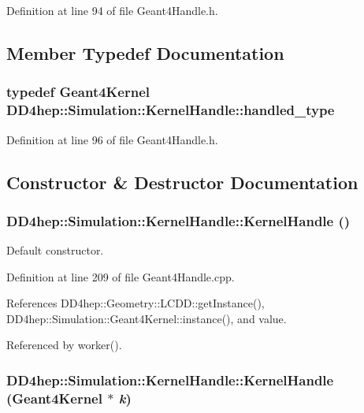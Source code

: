 Definition at line 94 of file Geant4Handle.h.

\subsection{Member Typedef Documentation}
\hypertarget{class_d_d4hep_1_1_simulation_1_1_kernel_handle_ab3846addea4978dab36bdb0cfb53dc34}{
\subsubsection[{handled\_\-type}]{\setlength{\rightskip}{0pt plus 5cm}typedef {\bf Geant4Kernel} {\bf DD4hep::Simulation::KernelHandle::handled\_\-type}}}
\label{class_d_d4hep_1_1_simulation_1_1_kernel_handle_ab3846addea4978dab36bdb0cfb53dc34}


Definition at line 96 of file Geant4Handle.h.

\subsection{Constructor \& Destructor Documentation}
\hypertarget{class_d_d4hep_1_1_simulation_1_1_kernel_handle_a03e3f33ee46b60ab2daaad008ef59418}{
\subsubsection[{KernelHandle}]{\setlength{\rightskip}{0pt plus 5cm}DD4hep::Simulation::KernelHandle::KernelHandle ()}}
\label{class_d_d4hep_1_1_simulation_1_1_kernel_handle_a03e3f33ee46b60ab2daaad008ef59418}


Default constructor. 

Definition at line 209 of file Geant4Handle.cpp.

References DD4hep::Geometry::LCDD::getInstance(), DD4hep::Simulation::Geant4Kernel::instance(), and value.

Referenced by worker().\hypertarget{class_d_d4hep_1_1_simulation_1_1_kernel_handle_afdab1fdc93f7b1a96c792dd03f97a6ef}{
\subsubsection[{KernelHandle}]{\setlength{\rightskip}{0pt plus 5cm}DD4hep::Simulation::KernelHandle::KernelHandle ({\bf Geant4Kernel} $\ast$ {\em k})}}
\label{class_d_d4hep_1_1_simulation_1_1_kernel_handle_afdab1fdc93f7b1a96c792dd03f97a6ef}


